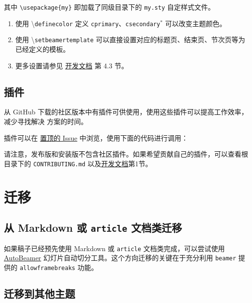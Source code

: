 \documentclass[
    UTF8,
    heading=true,
    12pt,
    a4paper
]{ctexrep}
\newenvironment{commentlist}
{\begin{enumerate}\small}
{\end{enumerate}}
\newcommand{\cmd}[1]{\textbackslash{}\texttt{#1}}
\newcommand{\cls}[1]{\texttt{#1}}
\newcommand{\opt}[1]{\texttt{#1}}
\begin{document}
其中 \verb"\usepackage{my}" 即加载了同级目录下的
\verb"my.sty" 自定样式文件。


\begin{commentlist}
  \item 使用 \cmd{definecolor} 定义
  \opt{cprimary}、\opt{csecondary}$^*$ 可以改变主题颜色。
  \item 使用 \cmd{setbeamertemplate}
  可以直接设置对应的标题页、结束页、节次页等为已经定义的模板。
  \item 更多设置请参见
  \href{run:sjtubeamerdevguide.pdf}{开发文档}
  第 4.3 节。
\end{commentlist}

\section{插件}

从 GitHub 下载的社区版本中有插件可供使用，使用这些插件可以提高工作效率，减少寻找解决
方案的时间。

插件可以在
\href{https://github.com/sjtug/SJTUBeamer/issues/81}
{置顶的 Issue} 中浏览，使用下面的代码进行调用：

请注意，发布版和安装版不包含社区插件。如果希望贡献自己的插件，可以查看根目录下的
\verb"CONTRIBUTING.md"
以及\href{run:sjtubeamerdevguide.pdf}{开发文档}第1节。


\chapter{迁移}

\section{从 Markdown 或 \cls{article} 文档类迁移}

如果稿子已经预先使用 Markdown 或 \cls{article} 文档类完成，可以尝试使用
\href{https://logcreative.github.io/AutoBeamer/}{AutoBeamer}
幻灯片自动切分工具。这个方向迁移的关键在于充分利用 \cls{beamer} 提供的
\opt{allowframebreaks} 功能。

\section{迁移到其他主题}
\end{document}
